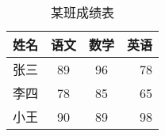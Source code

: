\documentclass{ctexart}
\begin{document}
    
\begin{table}
    
    \centering %

    \caption{某班成绩表}
    
    \begin{tabular}{|l||c|c|r|}
        \hline
        姓名 & 语文 & 数学 & 英语 \\ \hline 
        
        \hline
        张三 & 89 & 96 & 78 \\ \hline
        李四 & 78 & 85 & 65 \\ \hline
        小王 & 90 & 89 & 98 \\ \hline
    \end{tabular}
    
\end{table}
\end{document}
